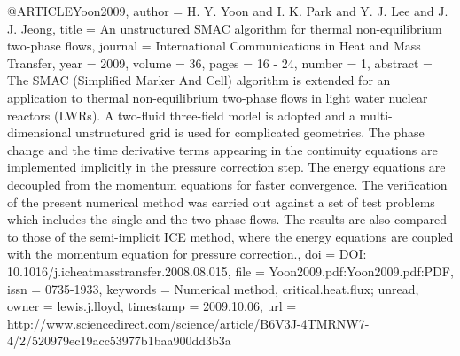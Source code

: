 {{@ARTICLE{Yoon2009,
  author = {H. Y. Yoon and I. K. Park and Y. J. Lee and J. J. Jeong},
  title = {An unstructured SMAC algorithm for thermal non-equilibrium two-phase
	flows},
  journal = {International Communications in Heat and Mass Transfer},
  year = {2009},
  volume = {36},
  pages = {16 - 24},
  number = {1},
  abstract = {The SMAC (Simplified Marker And Cell) algorithm is extended for an
	application to thermal non-equilibrium two-phase flows in light water
	nuclear reactors (LWRs). A two-fluid three-field model is adopted
	and a multi-dimensional unstructured grid is used for complicated
	geometries. The phase change and the time derivative terms appearing
	in the continuity equations are implemented implicitly in the pressure
	correction step. The energy equations are decoupled from the momentum
	equations for faster convergence. The verification of the present
	numerical method was carried out against a set of test problems which
	includes the single and the two-phase flows. The results are also
	compared to those of the semi-implicit ICE method, where the energy
	equations are coupled with the momentum equation for pressure correction.},
  doi = {DOI: 10.1016/j.icheatmasstransfer.2008.08.015},
  file = {Yoon2009.pdf:Yoon2009.pdf:PDF},
  issn = {0735-1933},
  keywords = {Numerical method, critical.heat.flux; unread},
  owner = {lewis.j.lloyd},
  timestamp = {2009.10.06},
  url = {http://www.sciencedirect.com/science/article/B6V3J-4TMRNW7-4/2/520979ec19acc53977b1baa900dd3b3a}
}

}}
